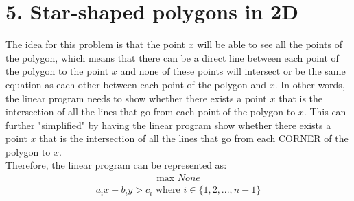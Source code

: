 \documentclass[11pt]{article}
\begin{document}
\newpage
\section*{5. Star-shaped polygons in 2D}
The idea for this problem is that the point $x$ will be able to see all the points of the polygon, which means that there can be a direct line between each point of the polygon to the point $x$ and none of these points will intersect or be the same equation as each other between each point of the polygon and $x$. In other words, the linear program needs to show whether there exists a point $x$ that is the intersection of all the lines that go from each point of the polygon to $x$. This can further "simplified" by having the linear program show whether there exists a point $x$ that is the intersection of all the lines that go from each CORNER of the polygon to $x$. \\
\vspace*{1\baselineskip}
Therefore, the linear program can be represented as:
\begin{align*}
\text{max } None
\end{align*}
\begin{align*}
a_i x + b_i y > c_i \text{ where } i \in \{1, 2, ..., n - 1\}
\end{align*}



\newpage
\end{document}
